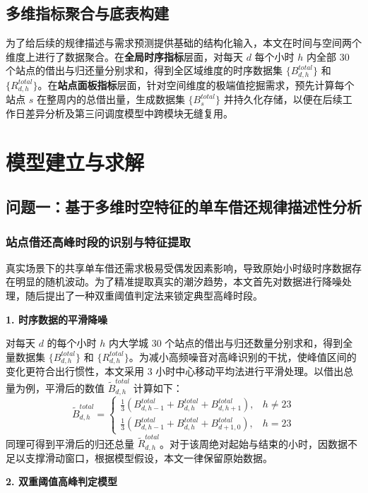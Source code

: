 \documentclass[a4paper, 12pt]{ctexart}
\begin{document}
\subsection{多维指标聚合与底表构建}
为了给后续的规律描述与需求预测提供基础的结构化输入，本文在时间与空间两个维度上进行了数据聚合。在\textbf{全局时序指标}层面，对每天 $d$ 每个小时 $h$ 内全部 30 个站点的借出与归还量分别求和，得到全区域维度的时序数据集 $\{B^{total}_{d, h}\}$ 和 $\{R^{total}_{d, h}\}$。在\textbf{站点面板指标}层面，针对空间维度的极端值挖掘需求，预先计算每个站点 $s$ 在整周内的总借出量，生成数据集 $\{B^{total}_{s}\}$ 并持久化存储，以便在后续工作日差异分析及第三问调度模型中跨模块无缝复用。

\section{模型建立与求解}

\subsection{问题一：基于多维时空特征的单车借还规律描述性分析} 

\subsubsection{站点借还高峰时段的识别与特征提取}

真实场景下的共享单车借还需求极易受偶发因素影响，导致原始小时级时序数据存在明显的随机波动。为了精准提取真实的潮汐趋势，本文首先对数据进行降噪处理，随后提出了一种双重阈值判定法来锁定典型高峰时段。

\textbf{1. 时序数据的平滑降噪}

对每天 $d$ 的每个小时 $h$ 内大学城 30 个站点的借出与归还数量分别求和，得到全量数据集 $\{B^{total}_{d, h}\}$ 和 $\{R^{total}_{d, h}\}$。为减小高频噪音对高峰识别的干扰，使峰值区间的变化更符合出行惯性，本文采用 3 小时中心移动平均法进行平滑处理。以借出总量为例，平滑后的数值 $\tilde{B}^{total}_{d, h}$ 计算如下：
$$
\tilde{B}_{d,h}^{total} = 
\begin{cases} 
\frac{1}{3}(B_{d,h-1}^{total} + B_{d,h}^{total} + B_{d,h+1}^{total}), & h \neq 23 \\ 
\frac{1}{3}(B_{d,h-1}^{total} + B_{d,h}^{total} + B_{d+1,0}^{total}), & h = 23 
\end{cases}
$$
同理可得到平滑后的归还总量 $\tilde{R}^{total}_{d, h}$。对于该周绝对起始与结束的小时，因数据不足以支撑滑动窗口，根据模型假设，本文一律保留原始数据。

\textbf{2. 双重阈值高峰判定模型}
\end{document}
